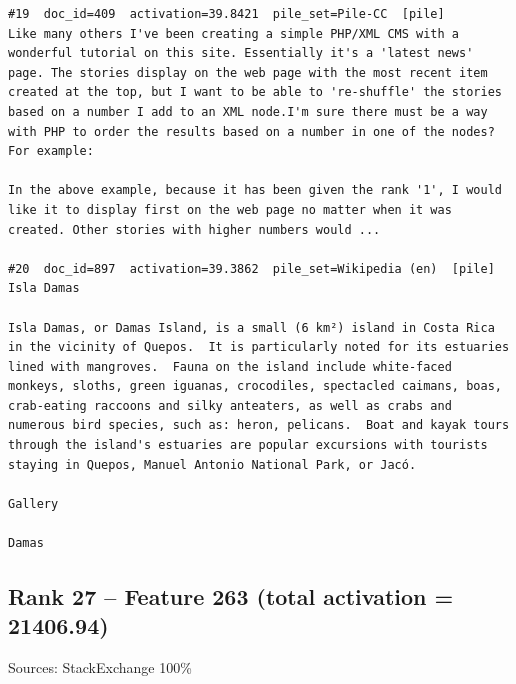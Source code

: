 \begin{verbatim}
#19  doc_id=409  activation=39.8421  pile_set=Pile-CC  [pile]
Like many others I've been creating a simple PHP/XML CMS with a wonderful tutorial on this site. Essentially it's a 'latest news' page. The stories display on the web page with the most recent item created at the top, but I want to be able to 're-shuffle' the stories based on a number I add to an XML node.I'm sure there must be a way with PHP to order the results based on a number in one of the nodes? For example:

In the above example, because it has been given the rank '1', I would like it to display first on the web page no matter when it was created. Other stories with higher numbers would ...

#20  doc_id=897  activation=39.3862  pile_set=Wikipedia (en)  [pile]
Isla Damas

Isla Damas, or Damas Island, is a small (6 km²) island in Costa Rica in the vicinity of Quepos.  It is particularly noted for its estuaries lined with mangroves.  Fauna on the island include white-faced monkeys, sloths, green iguanas, crocodiles, spectacled caimans, boas, crab-eating raccoons and silky anteaters, as well as crabs and numerous bird species, such as: heron, pelicans.  Boat and kayak tours through the island's estuaries are popular excursions with tourists staying in Quepos, Manuel Antonio National Park, or Jacó.

Gallery

Damas

\end{verbatim}

\subsection*{Rank 27 -- Feature 263 (total activation = 21406.94)}

Sources: StackExchange 100\%

